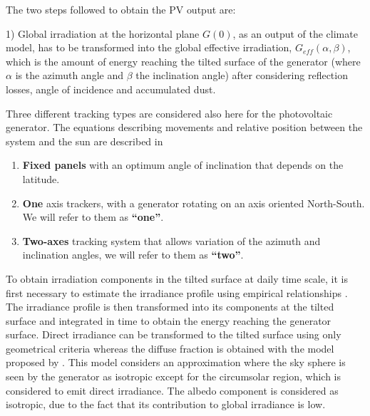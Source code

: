 The two steps followed to obtain the PV output are:

1) Global irradiation at the horizontal plane $G(0)$, as an output of the climate model, has to be transformed into the global effective irradiation, $G_{eff}(\alpha, \beta)$, which is the amount of energy reaching the tilted surface of the generator (where $\alpha$ is the azimuth angle and $\beta$ the inclination angle) after considering reflection losses, angle of incidence and accumulated dust.  



Three different tracking types are considered also here for the photovoltaic generator. The equations describing movements and relative position between the system and the sun are described in \cite{Perpinan2009}

\begin{enumerate}
\item \textbf{Fixed panels} with an optimum angle of inclination that depends on the latitude.
\item \textbf{One} axis trackers, with a generator rotating on an axis oriented North-South. We will refer to them as \textbf{“one”}.
\item \textbf{Two-axes} tracking system that allows variation of the azimuth and inclination angles, we will refer to them as \textbf{“two”}.
\end{enumerate}

To obtain irradiation components in the tilted surface at daily time scale, it is first necessary to estimate the irradiance profile using empirical relationships \cite*{Collares-Pereira1979}. The irradiance profile is then transformed into its components at the tilted surface and integrated in time to obtain the energy reaching the generator surface. Direct irradiance can be transformed to the tilted surface using only geometrical criteria whereas the diffuse fraction is obtained with the model proposed by \cite{hay1985estimating}. This model considers an approximation where the sky sphere is seen by the generator as isotropic except for the circumsolar region, which is considered to emit direct irradiance. The albedo component is considered as isotropic, due to the fact that its contribution to global irradiance is low. 

